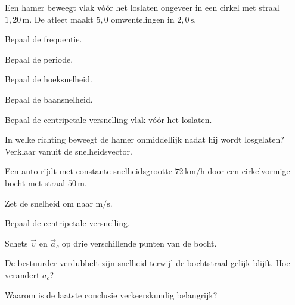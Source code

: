 \documentclass{ximera}
\begin{document}
\begin{oefening}[Hamerwerpen]{\oefB\ESS}

Een hamer beweegt vlak vóór het loslaten ongeveer in een cirkel met
straal $1,20\,\mathrm{m}$. De atleet maakt $5,0$ omwentelingen in
$2,0\,\mathrm{s}$.

\begin{question}
Bepaal de frequentie.
\end{question}

\begin{question}
Bepaal de periode.
\end{question}

\begin{question}
Bepaal de hoeksnelheid.
\end{question}

\begin{question}
Bepaal de baansnelheid.
\end{question}

\begin{question}
Bepaal de centripetale versnelling vlak vóór het loslaten.
\end{question}

\begin{question}
In welke richting beweegt de hamer onmiddellijk nadat hij wordt
losgelaten? Verklaar vanuit de snelheidsvector.
\end{question}

\end{oefening}


\begin{oefening}{\oefU\ESS}

Een auto rijdt met constante snelheidsgrootte
$72\,\mathrm{km/h}$ door een cirkelvormige bocht met straal
$50\,\mathrm{m}$.

\begin{question}
Zet de snelheid om naar $\mathrm{m/s}$.
\end{question}

\begin{question}
Bepaal de centripetale versnelling.
\end{question}

\begin{question}
Schets $\vec v$ en $\vec a_c$ op drie verschillende punten van de
bocht.
\end{question}

\begin{question}
De bestuurder verdubbelt zijn snelheid terwijl de bochtstraal gelijk
blijft. Hoe verandert $a_c$?
\end{question}

\begin{question}
Waarom is de laatste conclusie verkeerskundig belangrijk?
\end{question}

\end{oefening}
\end{document}
